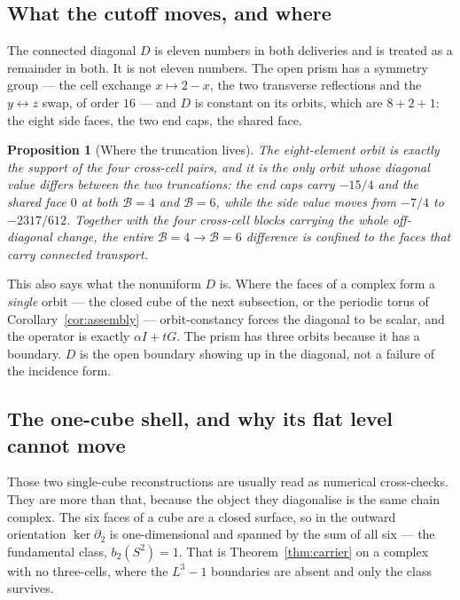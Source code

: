 \documentclass[11pt]{article}
\theoremstyle{plain}
\newtheorem{proposition}[theorem]{Proposition}
\theoremstyle{definition}
\theoremstyle{remark}
\newcommand{\chk}[1]{}
\begin{document}
\subsection{What the cutoff moves, and where}

The connected diagonal $D$ is eleven numbers in both deliveries and is treated
as a remainder in both. It is not eleven numbers. The open prism has a symmetry
group --- the cell exchange $x\mapsto2-x$, the two transverse reflections and
the $y\leftrightarrow z$ swap, of order $16$ --- and $D$ is constant on its
orbits, which are $8+2+1$: the eight side faces, the two end caps, the shared
face.

\begin{proposition}[Where the truncation lives]\label{prop:orbit}
The eight-element orbit is exactly the support of the four cross-cell pairs,
and it is the only orbit whose diagonal value differs between the two
truncations: the end caps carry $-15/4$ and the shared face $0$ at both
$\mathcal B=4$ and $\mathcal B=6$, while the side value moves from $-7/4$ to
$-2317/612$. Together with
the four cross-cell blocks carrying the whole off-diagonal change, the entire
$\mathcal B=4\to\mathcal B=6$ difference is confined to the faces that carry connected transport.
\end{proposition}
\chk{the connected diagonal is orbit-constant, and only the transporting orbit moves}

This also says what the nonuniform $D$ is. Where the faces of a complex form a
\emph{single} orbit --- the closed cube of the next subsection, or the periodic
torus of Corollary~\ref{cor:assembly} --- orbit-constancy forces the diagonal to
be scalar, and the operator is exactly $\alpha I+tG$. The prism has three
orbits because it has a boundary. $D$ is the open boundary showing up in the
diagonal, not a failure of the incidence form.

\subsection{The one-cube shell, and why its flat level cannot move}

Those two single-cube reconstructions are usually read as numerical
cross-checks. They are more than that, because the object they diagonalise is
the same chain complex. The six faces of a cube are a closed surface, so in the
outward orientation $\ker\partial_2$ is one-dimensional and spanned by the sum
of all six --- the fundamental class, $b_2(S^2)=1$. That is
Theorem~\ref{thm:carrier} on a complex with no three-cells, where the $L^3-1$
boundaries are absent and only the class survives.
\end{document}
